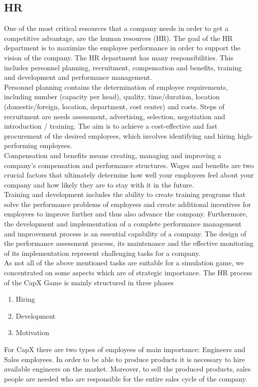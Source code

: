 \subsection{HR} 
\label{HR_manual}
One of the most critical resources that a company needs in order to get a competitive advantage, are the human resources (HR).
The goal of the HR department is to maximize the employee performance in order to support the vision of the company. The HR department has many responsibilities. This includes personnel planning, recruitment, compensation and benefits, training and development and performance management.\\
Personnel planning contains the determination of employee requirements, including number (capacity per head), quality, time/duration, location (domestic/foreign, location, department, cost center) and costs. Steps of recruitment are needs assessment, advertising, selection, negotiation and introduction / training. The aim is to achieve a cost-effective and fast procurement of the desired employees, which involves identifying and hiring high-performing employees. \\
Compensation and benefits means creating, managing and improving a company's compensation and performance structures. Wages and benefits are two crucial factors that ultimately determine how well your employees feel about your company and how likely they are to stay with it in the future.\\
Training and development includes the ability to create training programs that solve the performance problems of employees and create additional incentives for employees to improve further and thus also advance the company.
Furthermore, the development and implementation of a complete performance management and improvement process is an essential capability of a company. The design of the performance assessment process, its maintenance and the effective monitoring of its implementation represent challenging tasks for a company. \\
As not all of the above mentioned tasks are suitable for a simulation game, we concentrated on some aspects which are of strategic importance.
The HR process of the CapX Game is mainly structured in three phases
\begin{enumerate}
    \item Hiring
    \item Development
    \item Motivation
\end{enumerate}
For CapX there are two types of employees of main importance: Engineers and Sales employees. In order to be able to produce products it is necessary to hire available engineers on the market. Moreover, to sell the produced products, sales people are needed who are responsible for the entire sales cycle of the company.\\
